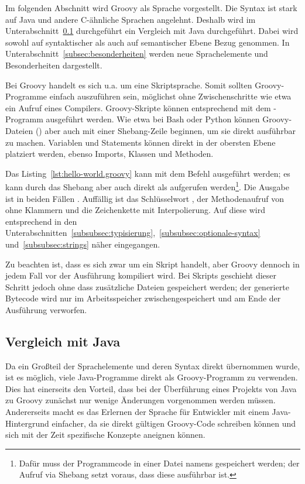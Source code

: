 Im folgenden Abschnitt wird Groovy als Sprache vorgestellt.
Die Syntax ist stark auf Java und andere C-ähnliche Sprachen angelehnt.
Deshalb wird im Unterabschnitt~\ref{subsec:vergleichMitJava} durchgeführt ein Vergleich mit Java durchgeführt.
Dabei wird sowohl auf syntaktischer als auch auf semantischer Ebene Bezug genommen.
In Unterabschnitt~\ref{subsec:besonderheiten} werden neue Sprachelemente und Besonderheiten dargestellt.

Bei Groovy handelt es sich {u.a.} um eine Skriptsprache.
Somit sollten Groovy-Programme einfach auszuführen sein, möglichst ohne Zwischenschritte wie etwa ein Aufruf eines Compilers.
Groovy-Skripte können entsprechend mit dem -Programm ausgeführt werden.
Wie etwa bei Bash oder Python können Groovy-Dateien () aber auch mit einer Shebang-Zeile beginnen, um sie direkt ausführbar zu machen.
Variablen und Statements können direkt in der obersten Ebene platziert werden, ebenso Imports, Klassen und Methoden.


Das Listing~\ref{lst:hello-world.groovy} kann mit dem Befehl  ausgeführt werden;
es kann durch das Shebang aber auch direkt als  aufgerufen werden\footnote{Dafür muss der Programmcode in einer Datei namens  gespeichert werden;
der Aufruf via Shebang setzt voraus, dass diese ausführbar ist.}.
Die Ausgabe ist in beiden Fällen .
Auffällig ist das Schlüsselwort , der Methodenaufruf von  ohne Klammern und die Zeichenkette mit Interpolierung.
Auf diese wird entsprechend in den Unterabschnitten~\ref{subsubsec:typisierung},~\ref{subsubsec:optionale-syntax} und~\ref{subsubsec:strings} näher eingegangen.

Zu beachten ist, dass es sich zwar um ein Skript handelt, aber Groovy dennoch in jedem Fall vor der Ausführung kompiliert wird.
Bei Skripts geschieht dieser Schritt jedoch ohne dass zusätzliche Dateien gespeichert werden;
der generierte Bytecode wird nur im Arbeitsspeicher zwischengespeichert und am Ende der Ausführung verworfen.

\subsection{Vergleich mit Java}\label{subsec:vergleichMitJava}

Da ein Großteil der Sprachelemente und deren Syntax direkt übernommen wurde, ist es möglich, viele Java-Programme direkt als Groovy-Programm zu verwenden.
Dies hat einerseits den Vorteil, dass bei der Überführung eines Projekts von Java zu Groovy zunächst nur wenige Änderungen vorgenommen werden müssen.
Andererseits macht es das Erlernen der Sprache für Entwickler mit einem Java-Hintergrund einfacher, da sie direkt gültigen Groovy-Code schreiben können und sich mit der Zeit spezifische Konzepte aneignen können.

